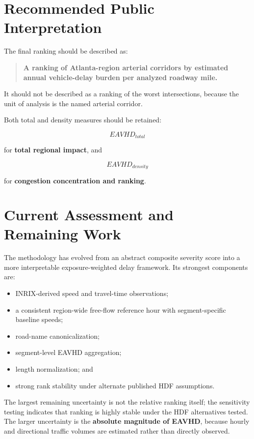 \documentclass[11pt]{article}
\begin{document}
\section{Recommended Public Interpretation}

The final ranking should be described as:

\begin{quote}
\textbf{A ranking of Atlanta-region arterial corridors by estimated annual vehicle-delay burden per analyzed roadway mile.}
\end{quote}

It should not be described as a ranking of the worst intersections, because the unit of analysis is the named arterial corridor.

Both total and density measures should be retained:

\[
\boxed{EAVHD_{total}}
\]

for \textbf{total regional impact}, and

\[
\boxed{EAVHD_{density}}
\]

for \textbf{congestion concentration and ranking}.

\section{Current Assessment and Remaining Work}

The methodology has evolved from an abstract composite severity score into a more interpretable exposure-weighted delay framework. Its strongest components are:

\begin{itemize}
    \item INRIX-derived speed and travel-time observations;
    \item a consistent region-wide free-flow reference hour with segment-specific baseline speeds;
    \item road-name canonicalization;
    \item segment-level EAVHD aggregation;
    \item length normalization; and
    \item strong rank stability under alternate published HDF assumptions.
\end{itemize}

The largest remaining uncertainty is not the relative ranking itself; the sensitivity testing indicates that ranking is highly stable under the HDF alternatives tested. The larger uncertainty is the \textbf{absolute magnitude of EAVHD}, because hourly and directional traffic volumes are estimated rather than directly observed.
\end{document}
